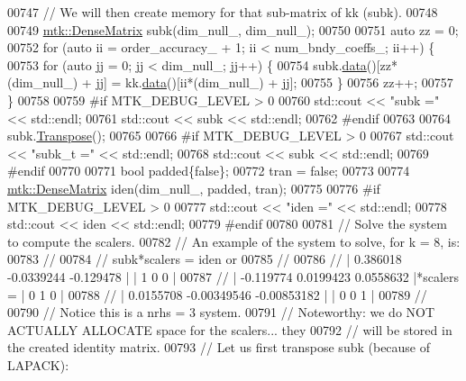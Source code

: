 \begin{DoxyCode}
{{00747   \textcolor{comment}{// We will then create memory for that sub-matrix of kk (subk).}
00748 
00749   \hyperlink{classmtk_1_1DenseMatrix}{mtk::DenseMatrix} subk(dim\_null\_, dim\_null\_);
00750 
00751   \textcolor{keyword}{auto} zz = 0;
00752   \textcolor{keywordflow}{for} (\textcolor{keyword}{auto} ii = order\_accuracy\_ + 1; ii < num\_bndy\_coeffs\_; ii++) \{
00753     \textcolor{keywordflow}{for} (\textcolor{keyword}{auto} jj = 0; jj < dim\_null\_; jj++) \{
00754       subk.\hyperlink{classmtk_1_1DenseMatrix_a16b3ff56feb2658b9fc7147d1de4d8e7}{data}()[zz*(dim\_null\_) + jj] = kk.\hyperlink{classmtk_1_1DenseMatrix_a16b3ff56feb2658b9fc7147d1de4d8e7}{data}()[ii*(dim\_null\_) + jj];
00755     \}
00756     zz++;
00757   \}
00758 
00759 \textcolor{preprocessor}{  #if MTK\_DEBUG\_LEVEL > 0}
00760   std::cout << \textcolor{stringliteral}{"subk ="} << std::endl;
00761   std::cout << subk << std::endl;
00762 \textcolor{preprocessor}{  #endif}
00763 
00764   subk.\hyperlink{classmtk_1_1DenseMatrix_a71d9c07ca66e88d97d1fd5012f43138b}{Transpose}();
00765 
00766 \textcolor{preprocessor}{  #if MTK\_DEBUG\_LEVEL > 0}
00767   std::cout << \textcolor{stringliteral}{"subk\_t ="} << std::endl;
00768   std::cout << subk << std::endl;
00769 \textcolor{preprocessor}{  #endif}
00770 
00771   \textcolor{keywordtype}{bool} padded\{\textcolor{keyword}{false}\};
00772   tran = \textcolor{keyword}{false};
00773 
00774   \hyperlink{classmtk_1_1DenseMatrix}{mtk::DenseMatrix} iden(dim\_null\_, padded, tran);
00775 
00776 \textcolor{preprocessor}{  #if MTK\_DEBUG\_LEVEL > 0}
00777   std::cout << \textcolor{stringliteral}{"iden ="} << std::endl;
00778   std::cout << iden << std::endl;
00779 \textcolor{preprocessor}{  #endif}
00780 
00781   \textcolor{comment}{// Solve the system to compute the scalers.}
00782   \textcolor{comment}{// An example of the system to solve, for k = 8, is:}
00783   \textcolor{comment}{//}
00784   \textcolor{comment}{// subk*scalers = iden or}
00785   \textcolor{comment}{//}
00786   \textcolor{comment}{// |  0.386018  -0.0339244   -0.129478 |           | 1 0 0 |}
00787   \textcolor{comment}{// | -0.119774   0.0199423   0.0558632 |*scalers = | 0 1 0 |}
00788   \textcolor{comment}{// | 0.0155708 -0.00349546 -0.00853182 |           | 0 0 1 |}
00789   \textcolor{comment}{//}
00790   \textcolor{comment}{// Notice this is a nrhs = 3 system.}
00791   \textcolor{comment}{// Noteworthy: we do NOT ACTUALLY ALLOCATE space for the scalers... they}
00792   \textcolor{comment}{// will be stored in the created identity matrix.}
00793   \textcolor{comment}{// Let us first transpose subk (because of LAPACK):}
}}
\end{DoxyCode}

